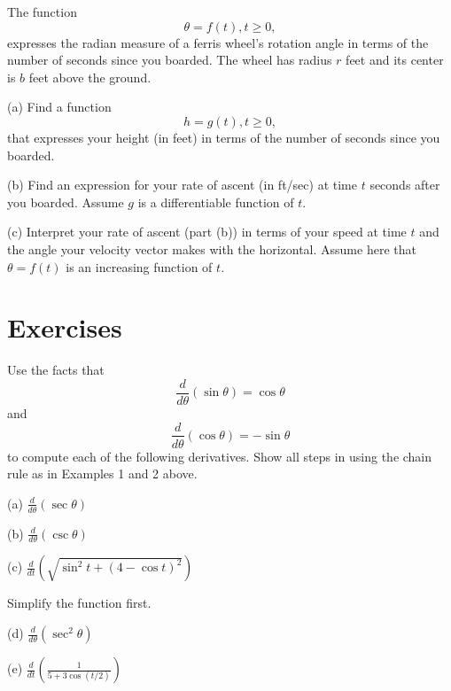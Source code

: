 \documentclass{ximera}
\begin{document}
\begin{question}  \label{Q:34e5t4566}
The function
\[
    \theta = f(t) , t \geq 0 ,
\]
expresses the radian measure of a ferris wheel's rotation angle in terms of the number of seconds since you boarded. The wheel has radius $r$ feet and its center is $b$ feet above the ground. 

(a) Find a function
\[
     h = g(t) , t \geq 0,
\]
 that expresses your height (in feet) in terms of the number of seconds since you boarded. 

(b) Find an expression for your rate of ascent (in ft/sec) at time $t$ seconds after you boarded. Assume $g$ is a differentiable function of $t$.

(c) Interpret your rate of ascent (part (b)) in terms of your speed at time $t$ and the angle your velocity vector makes with the horizontal. Assume here that $\theta=f(t)$ is an increasing function of $t$. 
\end{question}



\section*{Exercises}

\begin{exercise}  \label{ExLdfsdfll}
Use the facts that 
\[
\frac{d}{d\theta} \left( \sin\theta \right) = \cos\theta
\]
and
\[
\frac{d}{d\theta} \left( \cos\theta \right) = -\sin\theta
\]
to compute each of the following derivatives. Show all steps in using the chain rule as in Examples 1 and 2 above.

(a) $\frac{d}{d\theta} \left( \sec\theta \right)$

(b) $\frac{d}{d\theta} \left( \csc\theta \right)$

(c) $\frac{d}{dt} \left( \sqrt{\sin^2 t + (4-\cos t )^2} \right)$  

\begin{hint}
Simplify the function first.
\end{hint}

(d)  $\frac{d}{d\theta} \left( \sec^2\theta \right)$

(e) $\frac{d}{dt} \left( \frac{1}{5+3\cos (t/2)}   \right)$

\end{exercise}
\end{document}
